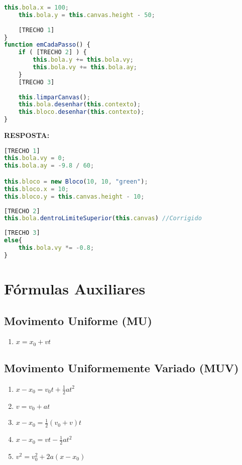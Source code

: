 \documentclass[12pt,a4paper,oneside]{article}
\begin{document}
\begin{enumerate}
\begin{lstlisting}[language=JavaScript]
	this.bola.x = 100;
	this.bola.y = this.canvas.height - 50;
	
	[TRECHO 1]
}
function emCadaPasso() {    
	if ( [TRECHO 2] ) {
		this.bola.y += this.bola.vy;
		this.bola.vy += this.bola.ay;
	} 
	[TRECHO 3]
	
	this.limparCanvas();
	this.bola.desenhar(this.contexto);
	this.bloco.desenhar(this.contexto);
}\end{lstlisting}

\newpage

{\color{blue} \bf RESPOSTA: } \\
\begin{lstlisting}[language=JavaScript]
[TRECHO 1]
this.bola.vy = 0;
this.bola.ay = -9.8 / 60;

this.bloco = new Bloco(10, 10, "green"); 
this.bloco.x = 10;
this.bloco.y = this.canvas.height - 10;
\end{lstlisting}

\begin{lstlisting}[language=JavaScript]
[TRECHO 2]
this.bola.dentroLimiteSuperior(this.canvas) //Corrigido
\end{lstlisting}

\begin{lstlisting}[language=JavaScript]
[TRECHO 3]
else{
	this.bola.vy *= -0.8;
}
\end{lstlisting}
	
\end{enumerate}

\newpage

\section{Fórmulas Auxiliares}

\subsection{Movimento Uniforme (MU)}

\begin{enumerate}
	\item $x = x_0 + vt$ 
\end{enumerate}

\subsection{Movimento Uniformemente Variado (MUV)}

\begin{enumerate}
	\item $x - x_0 = v_0t + \frac{1}{2}at^2$ 
	\item $v = v_0 + at$ 
	\item $x - x_0 = \frac{1}{2}(v_0 + v)t$ 
	\item $x - x_0 = vt - \frac{1}{2} a t^2$
	\item $v^2 = v_0^2 + 2a(x - x_0)$
\end{enumerate}
\end{document}
